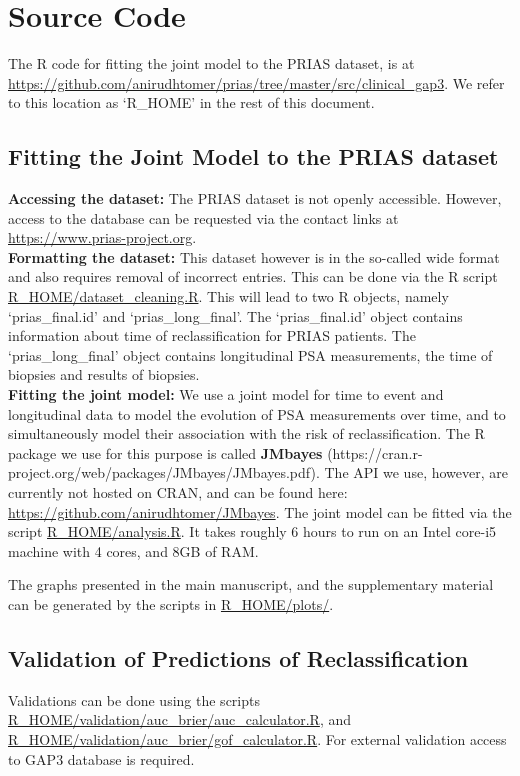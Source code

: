 \section{Source Code}
The R code for fitting the joint model to the PRIAS dataset, is at \url{https://github.com/anirudhtomer/prias/tree/master/src/clinical_gap3}. We refer to this location as `R\_HOME' in the rest of this document.

\subsection{Fitting the Joint Model to the PRIAS dataset}
\textbf{Accessing the dataset:}
The PRIAS dataset is not openly accessible. However, access to the database can be requested via the contact links at \url{https://www.prias-project.org}.\\

\textbf{Formatting the dataset:}
This dataset however is in the so-called wide format and also requires removal of incorrect entries. This can be done via the R script \url{R_HOME/dataset_cleaning.R}. This will lead to two R objects, namely `prias\_final.id' and `prias\_long\_final'. The `prias\_final.id' object contains information about time of reclassification for PRIAS patients. The `prias\_long\_final' object contains longitudinal PSA measurements, the time of biopsies and results of biopsies.\\

\textbf{Fitting the joint model:}
We use a joint model for time to event and longitudinal data to model the evolution of PSA measurements over time, and to simultaneously model their association with the risk of reclassification. The R package we use for this purpose is called \textbf{JMbayes} (https://cran.r-project.org/web/packages/JMbayes/JMbayes.pdf). The API we use, however, are currently not hosted on CRAN, and can be found here:
\url{https://github.com/anirudhtomer/JMbayes}. The joint model can be fitted via the script \url{R_HOME/analysis.R}. It takes roughly 6 hours to run on an Intel core-i5 machine with 4 cores, and 8GB of RAM. 

The graphs presented in the main manuscript, and the supplementary material can be generated by the scripts in \url{R_HOME/plots/}.

\subsection{Validation of Predictions of Reclassification}
Validations can be done using the scripts \url{R_HOME/validation/auc_brier/auc_calculator.R}, and \url{R_HOME/validation/auc_brier/gof_calculator.R}. For external validation access to GAP3 database is required.

